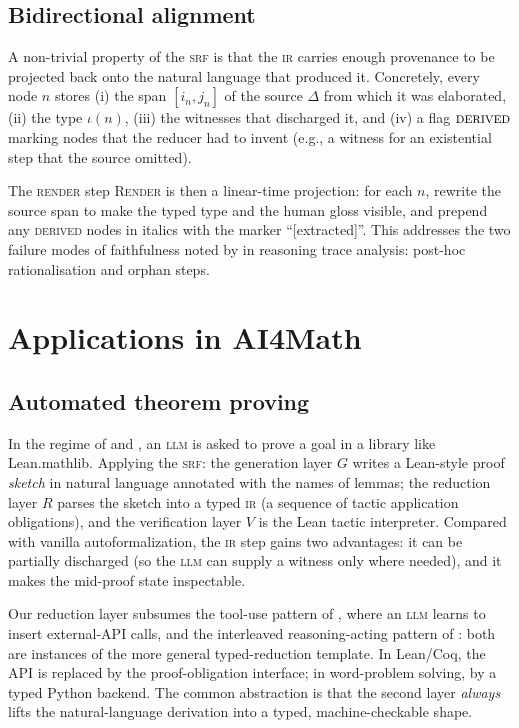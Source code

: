 \documentclass[11pt,a4paper]{article}
\newcommand{\LLM}{\textsc{llm}}
\newcommand{\IR}{\textsc{ir}}
\newcommand{\IRpipeline}{\textsc{srf}}
\newcommand{\Lean}{Lean}
\begin{document}
\subsection{Bidirectional alignment}
\label{ssec:bidi}

A non-trivial property of the \IRpipeline{} is that the \IR{}
carries enough provenance to be projected back onto the natural
language that produced it.  Concretely, every node $n$
stores (i) the span $[i_n, j_n]$ of the source $\Delta$ from which
it was elaborated, (ii) the type $\iota(n)$, (iii) the witnesses
that discharged it, and (iv) a flag $\textsc{derived}$ marking
nodes that the reducer had to invent (e.g., a witness for an
existential step that the source omitted).

The \textsc{render} step \textsc{Render} is then a linear-time
projection: for each $n$, rewrite the source span to make the typed
type and the human gloss visible, and prepend any \textsc{derived}
nodes in italics with the marker ``[extracted]''.  This addresses
the two failure modes of faithfulness noted by
\citet{lu2024mathvista} in reasoning trace analysis: post-hoc
rationalisation and orphan steps.

\section{Applications in AI4Math}
\label{sec:apps}

\subsection{Automated theorem proving}
In the regime of \citet{yang2023leandojo} and
\citet{wu2022autoformalization}, an \LLM{} is asked to prove a goal
in a library like \Lean{}.mathlib.  Applying the \IRpipeline{}: the
generation layer $G$ writes a Lean-style proof \emph{sketch} in
natural language annotated with the names of lemmas; the reduction
layer $R$ parses the sketch into a typed \IR{} (a sequence of tactic
application obligations), and the verification layer $V$ is the Lean
tactic interpreter.  Compared with vanilla autoformalization, the
\IR{} step gains two advantages: it can be partially discharged (so
the \LLM{} can supply a witness only where needed), and it makes the
mid-proof state inspectable.

Our reduction layer subsumes the tool-use pattern of
\citet{schick2023toolformer}, where an \LLM{} learns to insert
external-API calls, and the interleaved reasoning-acting pattern of
\citet{yao2023react}: both are instances of the more general
typed-reduction template.  In Lean/Coq, the API is replaced by the
proof-obligation interface; in word-problem solving, by a typed
Python backend.  The common abstraction is that the second layer
\emph{always} lifts the natural-language derivation into a typed,
machine-checkable shape.
\end{document}
